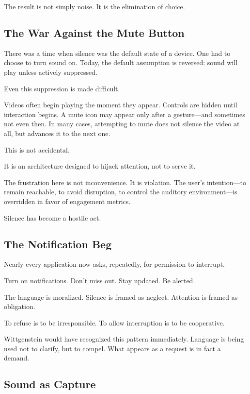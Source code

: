 \documentclass[11pt]{article}
\begin{document}
The result is not simply noise. It is the elimination of choice.

\subsection*{The War Against the Mute Button}

There was a time when silence was the default state of a device. One had to choose to turn sound on. Today, the default assumption is reversed: sound will play unless actively suppressed.

Even this suppression is made difficult.

Videos often begin playing the moment they appear. Controls are hidden until interaction begins. A mute icon may appear only after a gesture—and sometimes not even then. In many cases, attempting to mute does not silence the video at all, but advances it to the next one.

This is not accidental.

It is an architecture designed to hijack attention, not to serve it.

The frustration here is not inconvenience. It is violation. The user’s intention—to remain reachable, to avoid disruption, to control the auditory environment—is overridden in favor of engagement metrics.

Silence has become a hostile act.

\subsection*{The Notification Beg}

Nearly every application now asks, repeatedly, for permission to interrupt.

Turn on notifications.  
Don’t miss out.  
Stay updated.  
Be alerted.

The language is moralized. Silence is framed as neglect. Attention is framed as obligation.

To refuse is to be irresponsible. To allow interruption is to be cooperative.

Wittgenstein would have recognized this pattern immediately. Language is being used not to clarify, but to compel. What appears as a request is in fact a demand.

\subsection*{Sound as Capture}
\end{document}
